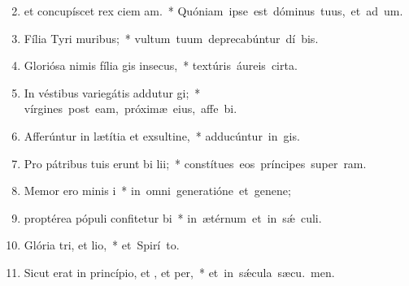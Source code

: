 \begin{flushleft}
\begin{enumerate}[leftmargin=*]
\setcounter{enumi}{1}

\item et concupíscet rex ciem am.~* \mbox{Quóniam ipse est dóminus tuus, et ad um.}

\item Fília Tyri  muribus;~* \mbox{vultum tuum deprecabúntur dí bis.}

\item Gloriósa nimis fília gis insecus,~* \mbox{textúris áureis cirta.}

\item In véstibus variegátis addutur gi;~* \mbox{vírgines post eam, próximæ eius, affe bi.}

\item Afferúntur in lætítia et exsultine,~* \mbox{adducúntur in  gis.}

\item Pro pátribus tuis erunt bi lii;~* \mbox{constítues eos príncipes super  ram.}

\item Memor ero minis i~* \mbox{in omni generatióne et genene;}

\item proptérea pópuli confitetur bi~* \mbox{in ætérnum et in s\'{\ae} culi.}

\item Glória tri, et lio,~* \mbox{et Spirí to.}

\item Sicut erat in princípio, et , et per,~* \mbox{et in s\'{\ae}cula sæcu. men.}

\end{enumerate}
\end{flushleft}

